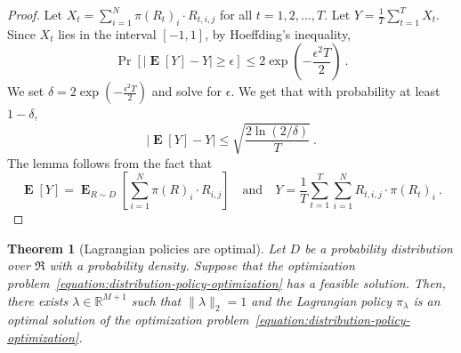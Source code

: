 \documentclass[12pt]{article}
\newcommand{\R}{\mathbb{R}}
\newcommand{\Requests}{\mathfrak{R}}
\DeclareMathOperator*{\Exp}{\mathbf{E}}
\newtheorem{theorem}{Theorem}
\theoremstyle{definition}
\begin{document}
\begin{proof}
Let $X_t = \sum_{i=1}^N \pi(R_t)_i \cdot R_{t,i,j}$ for all $t=1,2,\dots,T$. Let
$Y = \frac{1}{T} \sum_{t=1}^T X_t$. Since $X_t$ lies in the interval $[-1,1]$,
by Hoeffding's inequality,
$$
\Pr \left[ \left| \Exp[Y] - Y \right| \ge \epsilon \right]  \le 2 \exp\left( - \frac{\epsilon^2 T}{2} \right) \: .
$$
We set $\delta = 2 \exp\left( - \frac{\epsilon^2 T}{2} \right)$ and
solve for $\epsilon$. We get that with probability at least $1-\delta$,
$$
\left| \Exp[Y] - Y \right| \le \sqrt{ \frac{2\ln(2/\delta)}{T}} \: .
$$
The lemma follows from the fact that
$$
\Exp[Y] = \Exp_{R \sim D} \left[ \sum_{i=1}^N \pi(R)_i \cdot R_{i,j}  \right]
\quad \text{and} \quad
Y = \frac{1}{T} \sum_{t=1}^T \sum_{i=1}^N R_{t,i,j} \cdot \pi(R_t)_i \: .
$$
\end{proof}

\begin{theorem}[Lagrangian policies are optimal]
\label{theorem:lagrangian-policies-are-optimal}
Let $D$ be a probability distribution over $\Requests$ with a probability
density. Suppose that the optimization
problem~\eqref{equation:distribution-policy-optimization} has a feasible
solution. Then, there exists $\lambda \in \R^{M+1}$ such that $\|\lambda\|_2 =
1$ and the Lagrangian policy $\pi_\lambda$ is an optimal solution of the
optimization problem~\eqref{equation:distribution-policy-optimization}.
\end{theorem}
\end{document}
